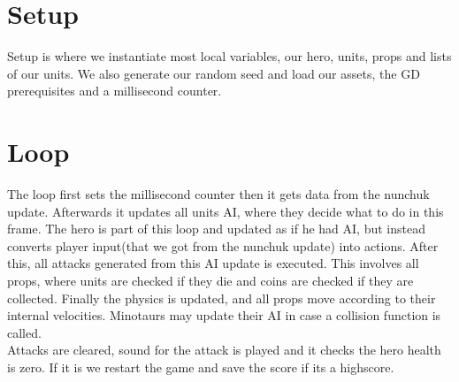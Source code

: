 \section{Setup}
Setup is where we instantiate most local variables, our hero, units, props and lists of our units. We also generate our random seed and load our assets, the GD prerequisites and a millisecond counter.

\section{Loop} %
The loop first sets the millisecond counter then it gets data from the nunchuk update. Afterwards it updates all units AI, where they decide what to do in this frame. The hero is part of this loop and updated as if he had AI, but instead converts player input(that we got from the nunchuk update) into actions. After this, all attacks generated from this AI update is executed. This involves all props, where units are checked if they die and coins are checked if they are collected. Finally the physics is updated, and all props move according to their internal velocities. Minotaurs may update their AI in case a collision function is called.\\
Attacks are cleared, sound for the attack is played and it checks the hero health is zero. If it is we restart the game and save the score if its a highscore.

